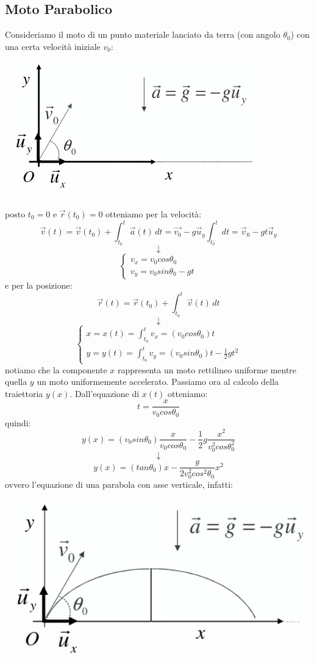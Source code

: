\documentclass[a4paper,12pt, oneside]{book}
\begin{document}
\subsection{Moto Parabolico}
Consideriamo il moto di un punto materiale lanciato da terra (con angolo $\theta_0$) con una certa velocità iniziale $v_0$:
\begin{center}
	\includegraphics[scale=0.5]{img/par.png}
\end{center}
posto $t_0=0$ e $\vec{r}(t_0)=0$
otteniamo per la velocità:
$$\vec{v}(t)=\vec{v}(t_0)+\int_{t_0}^t\vec{a}(t)\,dt=\vec{v_0}-g\vec{u}_y\int_{t_0}^t dt=\vec{v}_0-gt\vec{u}_y$$
$$\downarrow$$
$$
	\begin{cases}
		v_x=v_0cos\theta_0 \\
		v_y=v_0sin\theta_0-gt
	\end{cases}
$$
\newpage
e per la posizione:
$$\vec{r}(t)=\vec{r}(t_0)+\int_{t_0}^t\vec{v}(t)\,dt$$
$$\downarrow$$
$$
	\begin{cases}
		x=x(t)=\int_{t_0}^t v_x=(v_0cos\theta_0)t \\
		y=y(t)=\int_{t_0}^t v_y=(v_0sin\theta_0)t-\frac{1}{2}gt^2
	\end{cases}
$$
notiamo che la componente $x$ rappresenta un moto rettilineo uniforme mentre quella $y$ un moto uniformemente accelerato. Passiamo ora al calcolo della traiettoria $y(x)$. Dall'equazione di $x(t)$ otteniamo:
$$t=\frac{x}{v_0cos\theta_0}$$
quindi:
$$y(x)=(v_0sin\theta_0)\frac{x}{v_0cos\theta_0}-\frac{1}{2}g\frac{x^2}{v_0^2cos\theta^2_0}$$
$$\downarrow$$
$$y(x)=(tan\theta_0)x-\frac{g}{2v_0^2cos^2\theta_0}x^2$$
ovvero l'equazione di una parabola con asse verticale, infatti:
\begin{center}
	\includegraphics[scale=0.5]{img/par2.png}
\end{center}
\end{document}
